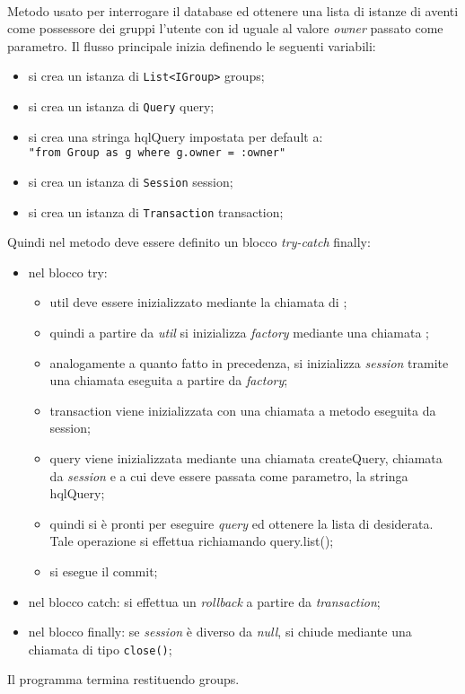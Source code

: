 \begin{description}
	\item{}\\
	Metodo usato per interrogare il database ed ottenere una lista di istanze di  aventi come possessore dei gruppi l'utente con id uguale al valore \textit{owner} passato come parametro. Il flusso principale inizia definendo le seguenti variabili:
	\begin{itemize}
		\item si crea un istanza di \texttt{List<IGroup>} groups;
		\item si crea un istanza di \texttt{Query} query;
		\item si crea una stringa hqlQuery impostata per default a:\\
			\verb|"from Group as g where g.owner = :owner"|
		\item si crea un istanza di \texttt{Session} session;
		\item si crea un istanza di \texttt{Transaction} transaction;
	\end{itemize}
	Quindi nel metodo deve essere definito un blocco \textit{try-catch} finally:
	\begin{itemize}
		\item nel blocco try:
		\begin{itemize}
			\item util deve essere inizializzato mediante la chiamata  di ;
			\item quindi a partire da \textit{util} si inizializza \textit{factory} mediante una chiamata ;
			\item analogamente a quanto fatto in precedenza, si inizializza \textit{session} tramite una chiamata  eseguita a partire da \textit{factory};
			\item transaction viene inizializzata con una chiamata a metodo  eseguita da session;
			\item query viene inizializzata mediante una chiamata createQuery, chiamata da \textit{session} e a cui deve essere passata come parametro, la stringa hqlQuery;
			\item quindi si è pronti per eseguire \textit{query} ed ottenere la lista di  desiderata. Tale operazione si effettua richiamando query.list();
			\item si esegue il commit;
		\end{itemize}
		\item nel blocco catch: si effettua un \textit{rollback} a partire da \textit{transaction};
		\item nel blocco finally: se \textit{session} è diverso da \textit{null}, si chiude mediante una chiamata di tipo \texttt{close()};
	\end{itemize}
	Il programma termina restituendo groups.
	
\end{description}

